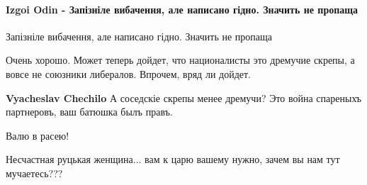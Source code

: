  
 
 
 
 
\paragraph{Izgoi Odin - Запізніле вибачення, але написано гідно. Значить не пропаща}
\label{sec:18_01_2021.fb.bilchenko_evgenia.1.mova_jazyk.cmt.izgoi_odin_vybachennja}

\begin{itemize}

Запізніле вибачення, але написано гідно. Значить не пропаща


Очень хорошо. Может теперь дойдет, что националисты это дремучие скрепы, а
вовсе не союзники либералов. Впрочем, вряд ли дойдет.

\begin{itemize}

\textbf{Vyacheslav Chechilo} А соседскіе скрепы менее дремучи? Это война спареныхъ партнеровъ, ваш батюшка былъ правъ.
\end{itemize}


Валю в расею!


Несчастная руцькая женщина... вам к царю вашему нужно, зачем вы нам тут
мучаетесь???

\begin{itemize}


\end{itemize}
\end{itemize}
